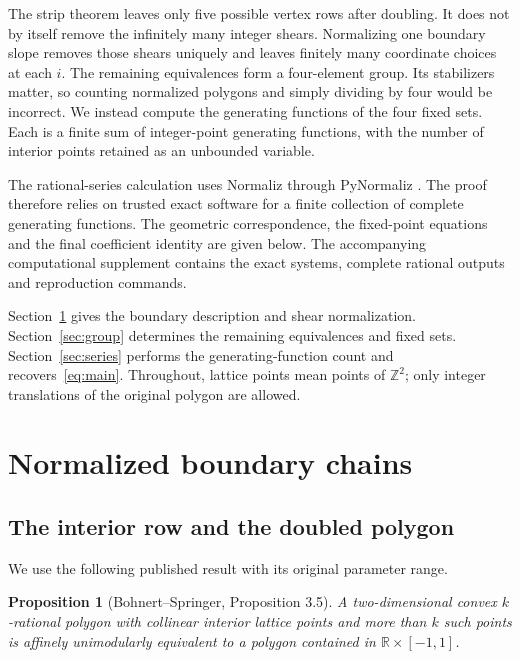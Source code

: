\documentclass[11pt]{article}
\newtheorem{proposition}[theorem]{Proposition}
\theoremstyle{remark}
\numberwithin{equation}{section}
\newcommand{\Z}{\mathbb Z}
\newcommand{\R}{\mathbb R}
\begin{document}
The strip theorem leaves only five possible vertex rows after doubling.
It does not by itself remove the infinitely many integer shears.
Normalizing one boundary slope removes those shears uniquely and leaves
finitely many coordinate choices at each $i$.
The remaining equivalences form a four-element group. Its stabilizers matter,
so counting normalized polygons and simply dividing by four would be
incorrect. We instead compute the generating functions of the four fixed
sets. Each is a finite sum of integer-point generating functions, with the
number of interior points retained as an unbounded variable.

The rational-series calculation uses Normaliz through PyNormaliz
\cite{BIS,Normaliz,PyNormaliz}. The proof therefore relies on trusted exact
software for a finite collection of complete generating functions.
The geometric correspondence, the fixed-point equations and the final
coefficient identity are given below. The accompanying computational
supplement contains the exact systems, complete rational outputs and
reproduction commands.

Section~\ref{sec:chains} gives the boundary description and shear
normalization. Section~\ref{sec:group} determines the remaining equivalences
and fixed sets. Section~\ref{sec:series} performs the generating-function
count and recovers~\eqref{eq:main}. Throughout, lattice points mean points of
$\Z^2$; only integer translations of the original polygon are allowed.

\section{Normalized boundary chains}\label{sec:chains}

\subsection{The interior row and the doubled polygon}

We use the following published result with its original parameter range.

\begin{proposition}[Bohnert--Springer, Proposition 3.5]\label{prop:strip}
A two-dimensional convex $k$-rational polygon with collinear interior
lattice points and more than $k$ such points is affinely unimodularly
equivalent to a polygon contained in $\R\times[-1,1]$.
\end{proposition}
\end{document}
